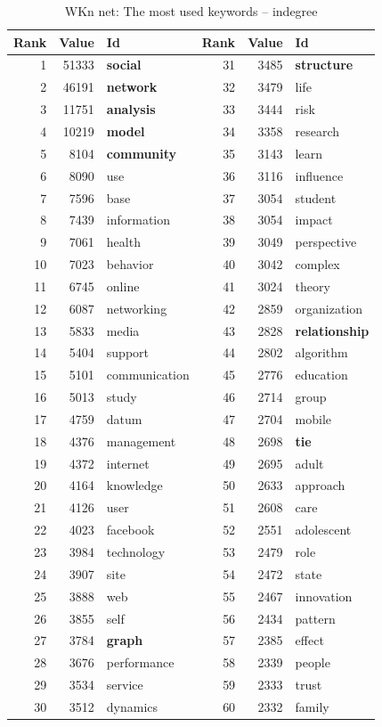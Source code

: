\documentclass[11pt]{article} %
\begin{document}
\begin{table}
\caption{WKn net: \label{keyind} The most used keywords -- indegree}\medskip
\renewcommand{\arraystretch}{0.9}
\begin{center}
\begin{tabular}{r|r|l||r|r|l}
Rank&  	Value&  	Id&  	Rank&  	Value&  	Id\\ \hline
1&  	51333&  	\textbf{social}&  	31&  	3485&  	\textbf{structure}\\
2&  	46191&  	\textbf{network}&  	32&  	3479&  	life\\
3&  	11751&         \textbf {analysis}&  	33&  	3444&  	risk\\
4&  	10219&  	\textbf{model}&  	34&  	3358&  	research\\
5&  	8104&  	\textbf{community}&  	35&  	3143&  	learn\\
6&  	8090&  	use&  	36&  	3116&  	influence\\
7&  	7596&  	base&  	37&  	3054&  	student\\
8&  	7439&  	information&  	38&  	3054&  	impact\\
9&  	7061&  	health&  	39&  	3049&  	perspective\\
10&  	7023&  	behavior&  	40&  	3042&  	complex\\
11&  	6745&  	online&  	41&  	3024&  	theory\\
12&  	6087&  	networking&  	42&  	2859&  	organization\\
13&  	5833&  	media&  	43&  	2828&  	\textbf{relationship}\\
14&  	5404&  	support&  	44&  	2802&  	algorithm\\
15&  	5101&  	communication&  	45&  	2776&  	education\\
16&  	5013&  	study&  	46&  	2714&  	group\\
17&  	4759&  	datum&  	47&  	2704&  	mobile\\
18&  	4376&  	management&  	48&  	2698&  	\textbf{tie}\\
19&  	4372&  	internet&  	49&  	2695&  	adult\\
20&  	4164&  	knowledge&  	50&  	2633&  	approach\\
21&  	4126&  	user&  	51&  	2608&  	care\\
22&  	4023&  	facebook&  	52&  	2551&  	adolescent\\
23&  	3984&  	technology&  	53&  	2479&  	role\\
24&  	3907&  	site&  	54&  	2472&  	state\\
25&  	3888&  	web&  	55&  	2467&  	innovation\\
26&  	3855&  	self&  	56&  	2434&  	pattern\\
27&  	3784&  	\textbf{graph}&  	57&  	2385&  	effect\\
28&  	3676&  	performance&  	58&  	2339&  	people\\
29&  	3534&  	service&  	59&  	2333&  	trust\\
30&  	3512&  	dynamics&  	60&  	2332&  	family\\ \hline
\end{tabular}
\end{center}

\end{table}
\end{document}
